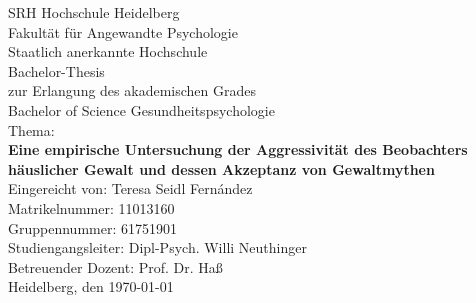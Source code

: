 \begin{titlepage}
\begin{center}

\thispagestyle{empty} 

    SRH Hochschule Heidelberg\\
    Fakultät für Angewandte Psychologie\\
    Staatlich anerkannte Hochschule\\[3cm]
    
    Bachelor-Thesis\\   
    zur Erlangung des akademischen Grades\\
    Bachelor of Science Gesundheitspsychologie\\[1.5cm]

    Thema:\\
    {\bf Eine empirische Untersuchung der Aggressivität des Beobachters häuslicher Gewalt
    und dessen Akzeptanz von Gewaltmythen} \\[2cm]  

    Eingereicht von: Teresa Seidl Fern\'andez\\    %
    Matrikelnummer: 11013160\\                     %
    Gruppennummer: 61751901\\[2.5cm]               %

    Studiengangsleiter: Dipl-Psych. Willi Neuthinger\\
    Betreuender Dozent: Prof. Dr. Haß\\[1cm]       %

    Heidelberg, den \today

\end{center}
\end{titlepage}